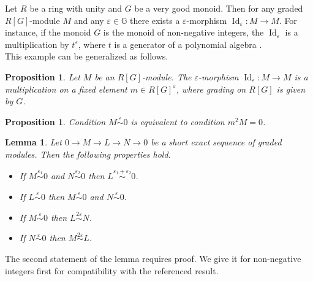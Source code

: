 \documentclass[english,12pt]{article}
\newcounter{stmcounter}[section]
\numberwithin{equation}{section}
\newtheorem{proposition}[stmcounter]{Proposition}
\newtheorem{lemma}[stmcounter]{Lemma}
\theoremstyle{definition}
\theoremstyle{remark}
\begin{document}
Let $R$ be a ring with unity and $G$ be a very good monoid. Then for any graded $R[G]$-module $M$ and any $\varepsilon \in \mathbb{G}$ there exists a $\varepsilon$-morphism $\operatorname{Id}_{\varepsilon} : M \to M$. For instance, if the monoid $G$ is the monoid of non-negative integers, the $\operatorname{Id}_{\varepsilon}$ is a multiplication by $t^{\varepsilon}$, where $t$ is a generator of a polynomial algebra {\cite[Example 2.8]{GS16}}.\\

This example can be generalized as follows.

\begin{proposition} \cite[Following the Equation 4]{Corbet18}
  \label{mult}
  Let $M$ be an $R[G]$-module. The $\varepsilon$-morphism $\operatorname{Id}_{\varepsilon} : M \to M$ is a multiplication on a fixed element $m \in R[G]^{\varepsilon}$, where grading on $R[G]$ is given by $G$.
\end{proposition}

\begin{proposition} {\cite[Proposition 2.13]{GS16}}
  \label{epstriv}
  Condition $M \stackrel{\varepsilon}{\sim} 0$ is equivalent to condition $m^2M = 0$.
\end{proposition}

\begin{lemma}
  \label{ops}
  Let $0 \to M \to L \to N \to 0$ be a short exact sequence of graded modules. Then the following properties hold.
  \begin{itemize}
    \item If $M \stackrel{\varepsilon_1}{\sim} 0$ and $N \stackrel{\varepsilon_2}{\sim} 0$ then $L \stackrel{\varepsilon_1 + \varepsilon_2}{\sim} 0$. {\cite[Proposition 4.6]{GS16}}
    \item If $L \stackrel{\varepsilon}{\sim} 0$ then $M \stackrel{\varepsilon}{\sim} 0$ and $N \stackrel{\varepsilon}{\sim} 0$.
    \item If $M \stackrel{\varepsilon}{\sim} 0$ then $L \stackrel{2\varepsilon}{\sim} N$. {\cite[Proposition 4.1]{GS16}}
    \item If $N \stackrel{\varepsilon}{\sim} 0$ then $M \stackrel{2\varepsilon}{\sim} L$. {\cite[Proposition 4.1]{GS16}}
  \end{itemize}
\end{lemma}

The second statement of the lemma requires proof. We give it for non-negative integers first for compatibility with the referenced result. 
\end{document}
